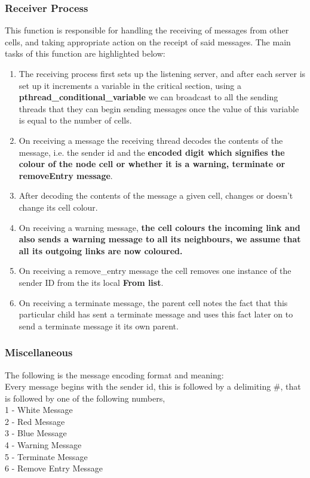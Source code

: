 \documentclass[a4paper,12pt]{report}
\begin{document}
\subsubsection{Receiver Process}
This function is responsible for handling the receiving of messages from other cells, and taking appropriate action on the receipt of said messages.
The main tasks of this function are highlighted below:
\begin{enumerate}
\item The receiving process first sets up the listening server, and after each server is set up it increments a variable in the critical section, using  a \textbf{pthread\_conditional\_variable} we can broadcast to all the sending threads that they can begin sending messages once the value of this variable is equal to the number of cells.
\item On receiving a message the receiving thread decodes the contents of the message, i.e. the sender id and the \textbf{encoded digit which signifies the colour of the node cell or whether it is a warning, terminate or removeEntry message}.
\item After decoding the contents of the message a given cell, changes or doesn't change its cell colour.
\item On receiving a warning message, \textbf{the cell colours the incoming link and also sends a warning message to all its neighbours, we assume that all its outgoing links are now coloured.}
\item On receiving a remove\_entry message the cell removes one instance of the sender ID from the its local \textbf{From list}.
\item On receiving a terminate message, the parent cell notes the fact that this particular child has sent a terminate message and uses this fact later on to send a terminate message it its own parent.
\end{enumerate}
\subsubsection{Miscellaneous}
The following is the message encoding format and meaning:\\
Every message begins with the sender id, this is followed by a delimiting \#, that is followed by one of the following numbers,\\
 1 - White Message\\
 2 - Red Message\\
 3 - Blue Message\\
 4 - Warning Message\\
 5 - Terminate Message\\
 6 - Remove Entry Message\\
\end{document}
